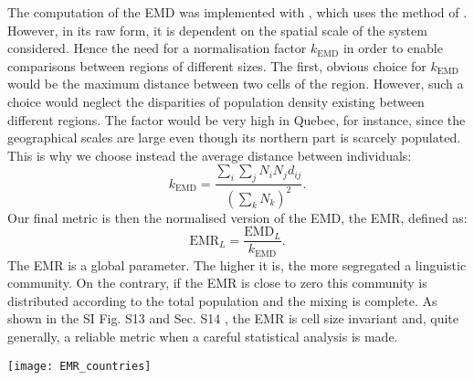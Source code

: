 \documentclass[../thesis.tex]{subfiles}
\begin{document}
The computation of the \ac{EMD} was implemented with \cite{FlamaryPOTPython2021}, which uses
the method of \cite{BonneelDisplacementInterpolation2011}. However, in its raw form, it
is dependent on the spatial scale of the system considered. Hence the need for a
normalisation factor $k_\text{EMD}$ in order to enable comparisons between regions of
different sizes. The first, obvious choice for $k_\text{EMD}$ would be the maximum
distance between two cells of the region. However, such a choice would neglect the
disparities of population density existing between different regions. The factor would
be very high in Quebec, for instance, since the geographical scales are large even
though its northern part is scarcely populated. This is why we choose instead the
average distance between individuals:
\begin{equation}
    k_\text{EMD} = \frac{\sum_i \sum_j N_i N_j d_{ij} }{\left( \sum_k N_k \right)^2}.
\end{equation}
Our final metric is then the normalised version of the \ac{EMD}, the \ac{EMR}, defined as:
\begin{equation}
\text{EMR}_L = \frac{\text{EMD}_L}{k_\text{EMD}} .
\end{equation}
The \ac{EMR} is a global parameter. The higher it is, the more segregated a linguistic
community. On the contrary, if the \ac{EMR} is close to zero this community is distributed
according to the total population and the mixing is complete. As shown in the SI Fig.
S13 and Sec. S14 \cite{supp}, the \ac{EMR} is cell size invariant and, quite generally, a
reliable metric when a careful statistical analysis is made.

\begin{figure*}[h!]
  \centering
  \texttt{[image: EMR\_countries]}
  \caption{\acp{EMR} of the (a) monolingual and (b) multilingual groups of multilingual
  regions of interest, ranked left to right by increasing average of the $y$-axis
  values. In (b), the point for trilinguals in Switzerland is not displayed
  because its value was deemed unreliable (for more details see SI Sec. IF
  \cite{supp}). A rich diversity of mixing patterns is shown, beyond the two
  paradigmatic cases of Catalonia and Belgium.}
  \label{fig:EMR_countries}
\end{figure*}
\end{document}
